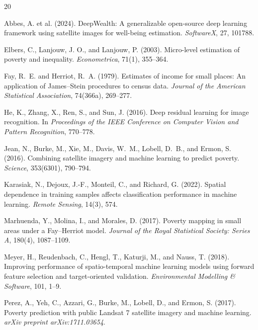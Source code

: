 \documentclass[11pt,a4paper]{article}
\begin{document}
\begin{thebibliography}{20}

Abbes, A. et al. (2024).
\newblock DeepWealth: A generalizable open-source deep learning framework using satellite images for well-being estimation.
\newblock \emph{SoftwareX}, 27, 101788.

Elbers, C., Lanjouw, J. O., and Lanjouw, P. (2003).
\newblock Micro-level estimation of poverty and inequality.
\newblock \emph{Econometrica}, 71(1), 355--364.

Fay, R.~E. and Herriot, R.~A. (1979).
\newblock Estimates of income for small places: An application of James--Stein procedures to census data.
\newblock \emph{Journal of the American Statistical Association}, 74(366a), 269--277.

He, K., Zhang, X., Ren, S., and Sun, J. (2016).
\newblock Deep residual learning for image recognition.
\newblock In \emph{Proceedings of the IEEE Conference on Computer Vision and Pattern Recognition}, 770--778.

Jean, N., Burke, M., Xie, M., Davis, W.~M., Lobell, D.~B., and Ermon, S. (2016).
\newblock Combining satellite imagery and machine learning to predict poverty.
\newblock \emph{Science}, 353(6301), 790--794.

Karasiak, N., Dejoux, J.-F., Monteil, C., and Richard, G. (2022).
\newblock Spatial dependence in training samples affects classification performance in machine learning.
\newblock \emph{Remote Sensing}, 14(3), 574.

Marhuenda, Y., Molina, I., and Morales, D. (2017).
\newblock Poverty mapping in small areas under a Fay--Herriot model.
\newblock \emph{Journal of the Royal Statistical Society: Series A}, 180(4), 1087--1109.

Meyer, H., Reudenbach, C., Hengl, T., Katurji, M., and Nauss, T. (2018).
\newblock Improving performance of spatio-temporal machine learning models using forward feature selection and target-oriented validation.
\newblock \emph{Environmental Modelling \& Software}, 101, 1--9.

Perez, A., Yeh, C., Azzari, G., Burke, M., Lobell, D., and Ermon, S. (2017).
\newblock Poverty prediction with public Landsat 7 satellite imagery and machine learning.
\newblock \emph{arXiv preprint arXiv:1711.03654}.


\end{thebibliography}
\end{document}
